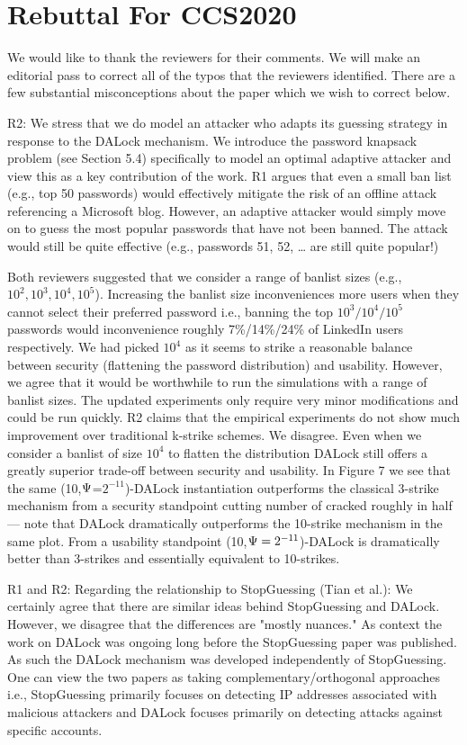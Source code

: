 \section{Rebuttal For CCS2020}
We would like to thank the reviewers for their comments. We will make an editorial pass to correct all of the typos that the reviewers identified. There are a few substantial misconceptions about the paper which we wish to correct below.

R2: We stress that we do model an attacker who adapts its guessing strategy in response to the DALock mechanism. We introduce the password knapsack problem (see Section 5.4) specifically to model an optimal adaptive attacker and view this as a key contribution of the work. R1 argues that even a small ban list (e.g., top 50 passwords) would effectively mitigate the risk of an offline attack referencing a Microsoft blog. However, an adaptive attacker would simply move on to guess the most popular passwords that have not been banned. The attack would still be quite effective (e.g., passwords 51, 52, … are still quite popular!)

Both reviewers suggested that we consider a range of banlist sizes (e.g., $10^2,10^3,10^4, 10^5$). Increasing the banlist size inconveniences more users when they cannot select their preferred password i.e., banning the top $10^3/10^4/10^5$ passwords would inconvenience roughly 7\%/14\%/24\% of LinkedIn users respectively. We had picked $10^4$ as it seems to strike a reasonable balance between security (flattening the password distribution) and usability. However, we agree that it would be worthwhile to run the simulations with a range of banlist sizes. The updated experiments only require very minor modifications and could be run quickly. R2 claims that the empirical experiments do not show much improvement over traditional k-strike schemes. We disagree. Even when we consider a banlist of size $10^4$ to flatten the distribution DALock still offers a greatly superior trade-off between security and usability. In Figure 7 we see that the same (10,$\Psi$=$2^{-11}$)-DALock instantiation outperforms the classical 3-strike mechanism from a security standpoint cutting number of cracked roughly in half --- note that DALock dramatically outperforms the 10-strike mechanism in the same plot. From a usability standpoint (10,$\Psi=2^{-11}$)-DALock is dramatically better than 3-strikes and essentially equivalent to 10-strikes.

R1 and R2: Regarding the relationship to StopGuessing (Tian et al.): We certainly agree that there are similar ideas behind StopGuessing and DALock. However, we disagree that the differences are "mostly nuances." As context the work on DALock was ongoing long before the StopGuessing paper was published. As such the DALock mechanism was developed independently of StopGuessing. One can view the two papers as taking complementary/orthogonal approaches i.e., StopGuessing primarily focuses on detecting IP addresses associated with malicious attackers and DALock focuses primarily on detecting attacks against specific accounts.